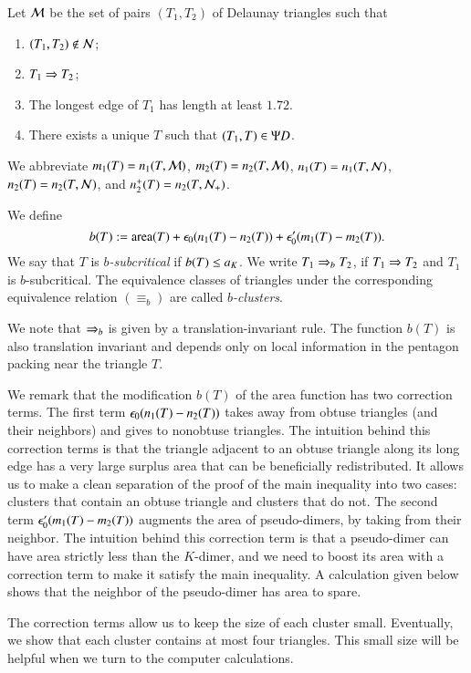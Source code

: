 Let $\mathcal M$ be the set of pairs $(T_1,T_2)$ of Delaunay triangles such that
\begin{enumerate}
\item $(T_1,T_2)\not\in \mathcal N$;
\item $T_1\Rightarrow T_2$;
\item The longest edge of $T_1$ has length  at least $1.72$.
\item There exists a unique $T$ such that $(T_1,T)\in \Psi D$.
\end{enumerate}

We abbreviate $m_1(T) = n_1(T,\mathcal M)$, $m_2(T) = n_2(T,\mathcal M)$, $n_1(T) = n_1(T,\mathcal N)$, $n_2(T) = n_2(T,\mathcal N)$,
and $n_2^+(T) = n_2(T,\mathcal N_+)$.

We define
\[
b(T) := {\operatorname{area}}(T) + \epsilon_0 (n_1(T) - n_2(T)) + \epsilon_0' (m_1(T) - m_2(T)).
\]
We say that $T$ is {\it $b$-subcritical} if $b(T) \le a_K$.  We write
$T_1\Rightarrow_{b} T_2$, if $T_1\Rightarrow T_2$ and $T_1$ is $b$-subcritical.
The equivalence classes of triangles under the corresponding
equivalence relation $(\equiv_b)$ are called {\it $b$-clusters}.

We note that $\Rightarrow_{b}$ is given by a translation-invariant rule.  The function $b(T)$ is also
translation invariant and depends only on local information in the pentagon packing near  the triangle $T$.

We remark that the modification $b(T)$ of the area function has two correction terms.
The first term $\epsilon_0 (n_1(T) - n_2(T))$ takes away from obtuse triangles (and their neighbors) and gives 
 to nonobtuse triangles.  
The intuition behind this correction terms is that the triangle adjacent to an obtuse triangle along its long edge
has a very large surplus area that can be beneficially redistributed.  It allows us to make a clean separation of
the proof of the main inequality into two cases: clusters that contain an obtuse triangle and clusters that do not.
The second term $\epsilon_0' (m_1(T) - m_2(T))$ augments the area of pseudo-dimers, by taking from
their neighbor.   The intuition behind this correction term is that a pseudo-dimer can have area strictly less than
the $K$-dimer, and we need to boost its area with a correction term to make it satisfy the main
inequality.  A calculation given below shows that the neighbor of the pseudo-dimer has area to spare.

The correction terms allow us to keep the size of each cluster small.  Eventually, we show that each
cluster contains at most four triangles.  This small size will be helpful when we turn to the computer calculations.


